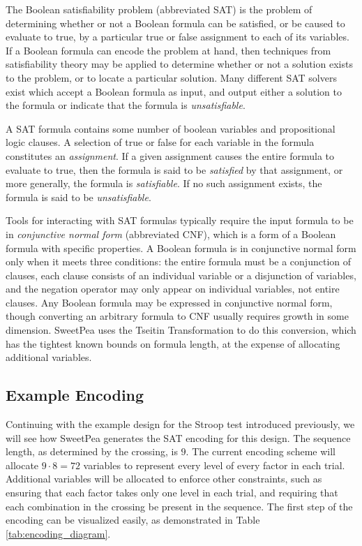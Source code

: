 The Boolean satisfiability problem (abbreviated SAT) is the problem of determining whether or not a Boolean formula can be satisfied, or be caused to evaluate to true, by a particular true or false assignment to each of its variables. If a Boolean formula can encode the problem at hand, then techniques from satisfiability theory may be applied to determine whether or not a solution exists to the problem, or to locate a particular solution. Many different SAT solvers exist which accept a Boolean formula as input, and output either a solution to the formula or indicate that the formula is \textit{unsatisfiable}.

A SAT formula contains some number of boolean variables and propositional logic clauses. A selection of true or false for each variable in the formula constitutes an \textit{assignment}. If a given assignment causes the entire formula to evaluate to true, then the formula is said to be \textit{satisfied} by that assignment, or more generally, the formula is \textit{satisfiable}. If no such assignment exists, the formula is said to be \textit{unsatisfiable}.

Tools for interacting with SAT formulas typically require the input formula to be in \textit{conjunctive normal form} (abbreviated CNF), which is a form of a Boolean formula with specific properties. A Boolean formula is in conjunctive normal form only when it meets three conditions: the entire formula must be a conjunction of clauses, each clause consists of an individual variable or a disjunction of variables, and the negation operator may only appear on individual variables, not entire clauses. Any Boolean formula may be expressed in conjunctive normal form, though converting an arbitrary formula to CNF usually requires growth in some dimension. SweetPea uses the Tseitin Transformation \cite{tseitin1983complexity} to do this conversion, which has the tightest known bounds on formula length, at the expense of allocating additional variables.

\subsection{Example Encoding}

Continuing with the example design for the Stroop test introduced previously, we will see how SweetPea generates the SAT encoding for this design. The sequence length, as determined by the crossing, is $9$. The current encoding scheme will allocate $9 \cdot 8 = 72$ variables to represent every level of every factor in each trial. Additional variables will be allocated to enforce other constraints, such as ensuring that each factor takes only one level in each trial, and requiring that each combination in the crossing be present in the sequence. The first step of the encoding can be visualized easily, as demonstrated in Table \ref{tab:encoding_diagram}.

